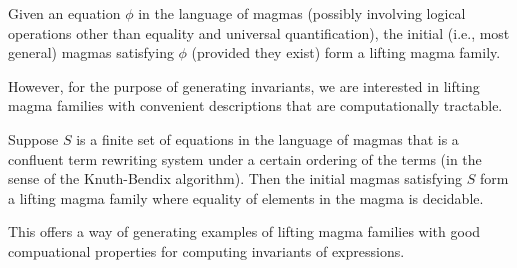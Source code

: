 \begin{remark}
Given an equation $\phi$ in the language of magmas (possibly involving logical operations other than equality and universal quantification), the initial (i.e., most general) magmas satisfying $\phi$ (provided they exist) form a lifting magma family.

However, for the purpose of generating invariants, we are interested in lifting magma families with convenient descriptions that are computationally tractable.
\end{remark}

\begin{remark}
Suppose $S$ is a finite set of equations in the language of magmas that is a confluent term rewriting system under a certain ordering of the terms (in the sense of the Knuth-Bendix algorithm). Then the initial magmas satisfying $S$ form a lifting magma family where equality of elements in the magma is decidable.

This offers a way of generating examples of lifting magma families with good compuational properties for computing invariants of expressions.
\end{remark}
